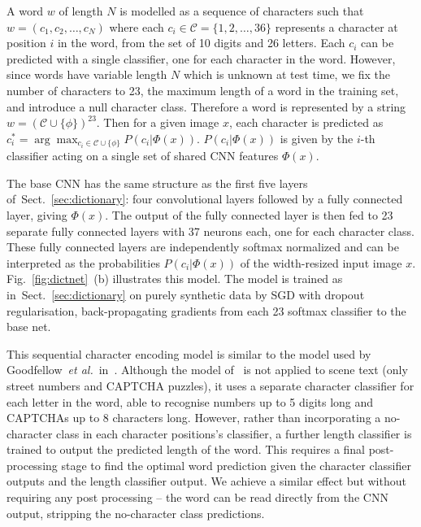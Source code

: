 \documentclass{article} \usepackage{nips14submit_e,times}
\newcommand{\figref}[1]{Fig.~\ref{#1}}
\newcommand{\sref}[1]{Sect.~\ref{#1}}
\def\etal{\emph{et al.}}
\newcommand{\chars}{\mathcal{C}}
\renewcommand{\paragraph}[1]{\par\noindent{\bf #1}}
\begin{document}
A word $w$ of length $N$ is modelled as a sequence of characters such that $w = (c_1, c_2, \dots, c_N)$ where each $c_i \in \chars = \{1,2,\dots,36\}$ represents a character at position $i$ in the word, from the set of 10 digits and 26 letters. Each $c_i$ can be predicted with a single classifier, one for each character in the word. However, since words have variable length $N$ which is unknown at test time, we fix the number of characters to 23, the maximum length of a word in the training set, and introduce a null character class. Therefore a word is represented by a string $w = (\chars \cup \{\phi\})^{23}$. Then for a given image $x$, each character is predicted as $c_i^* = \arg\max_{c_i \in \chars \cup \{\phi\}} P(c_i|\Phi(x))$. $P(c_i|\Phi(x))$ is given by the $i$-th classifier acting on a single set of shared CNN features $\Phi(x)$. 

The base CNN has the same structure as the first five layers of~\sref{sec:dictionary}: four convolutional layers followed by a fully connected layer, giving $\Phi(x)$. The output of the fully connected layer is then fed to 23 separate fully connected layers with 37 neurons each, one for each character class. These fully connected layers are independently softmax normalized and can be interpreted as the probabilities $P(c_i|\Phi(x))$ of the width-resized input image $x$. \figref{fig:dictnet}~(b) illustrates this model.
The model is trained as in~\sref{sec:dictionary} on purely synthetic data by SGD with dropout regularisation, back-propagating gradients from each 23 softmax classifier to the base net.

\paragraph{Discussion.}
This sequential character encoding model is similar to the model used by Goodfellow~\etal~in~\cite{Goodfellow13}. Although the model of~\cite{Goodfellow13} is not applied to scene text (only street numbers and CAPTCHA puzzles), it uses a separate character classifier for each letter in the word, able to recognise numbers up to 5 digits long and CAPTCHAs up to 8 characters long. However, rather than incorporating a no-character class in each character positions's classifier, a further length classifier is trained to output the predicted length of the word. This requires a final post-processing stage to find the optimal word prediction given the character classifier outputs and the length classifier output. We achieve a similar effect but without requiring any post processing -- the word can be read directly from the CNN output, stripping the no-character class predictions.
\end{document}
